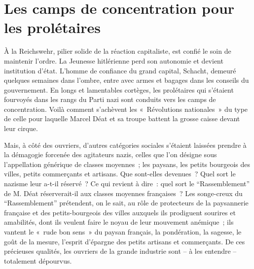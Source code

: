 \documentclass[french,twoside]{book} %
\begin{document}
\section[Les camps de concentration pour les prolétaires]{Les camps de concentration pour les prolétaires}
\noindent À la Reichswehr, pilier solide de la réaction capitaliste, est confié le soin de maintenir l’ordre. La Jeunesse hitlérienne perd son autonomie et devient institution d’état. L’homme de confiance du grand capital, Schacht, demeuré quelques semaines dans l’ombre, entre avec armes et bagages dans les conseils du gouvernement. En longs et lamentables cortèges, les prolétaires qui s’étaient fourvoyés dans les rangs du Parti nazi sont conduits vers les camps de concentration. Voilà comment s’achèvent les « Révolutions nationales » du type de celle pour laquelle Marcel Déat et sa troupe battent la grosse caisse devant leur cirque.\par
Mais, à côté des ouvriers, d’autres catégories sociales s’étaient laissées prendre à la démagogie forcenée des agitateurs nazis, celles que l’on désigne sous l’appellation générique de classes moyennes ; les paysans, les petits bourgeois des villes, petits commerçants et artisans. Que sont-elles devenues ? Quel sort le nazisme leur a-t-il réservé ? Ce qui revient à dire : quel sort le “Rassemblement” de M. Déat réserverait-il aux classes moyennes françaises ? Les songe-creux du “Rassemblement” prétendent, on le sait, au rôle de protecteurs de la paysannerie française et des petits-bourgeois des villes auxquels ils prodiguent sourires et amabilités, dont ils veulent faire le noyau de leur mouvement anémique ; ils vantent le « rude bon sens » du paysan français, la pondération, la sagesse, le goût de la mesure, l’esprit d’épargne des petits artisans et commerçants. De ces précieuses qualités, les ouvriers de la grande industrie sont – à les entendre – totalement dépourvus.
\end{document}
